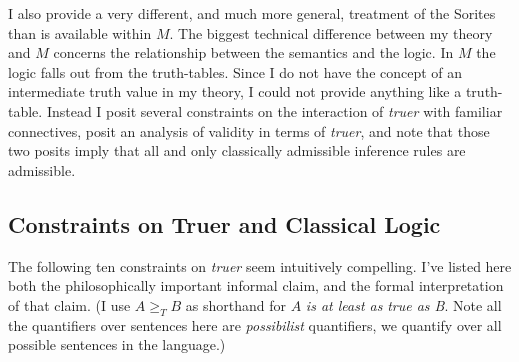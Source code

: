 I also provide a very different, and much more general, treatment of the
Sorites than is available within \(M\). The biggest technical difference
between my theory and \(M\) concerns the relationship between the
semantics and the logic. In \(M\) the logic falls out from the
truth-tables. Since I do not have the concept of an intermediate truth
value in my theory, I could not provide anything like a truth-table.
Instead I posit several constraints on the interaction of \emph{truer}
with familiar connectives, posit an analysis of validity in terms of
\emph{truer}, and note that those two posits imply that all and only
classically admissible inference rules are admissible.

\hypertarget{constraints-on-truer-and-classical-logic}{%
\subsection{Constraints on Truer and Classical
Logic}\label{constraints-on-truer-and-classical-logic}}

The following ten constraints on \emph{truer} seem intuitively
compelling. I've listed here both the philosophically important informal
claim, and the formal interpretation of that claim. (I use
\(A \geqslant _T B\) as shorthand for \(A\) \emph{is at least as}
\emph{true as B}. Note all the quantifiers over sentences here are
\emph{possibilist} quantifiers, we quantify over all possible sentences
in the language.)

